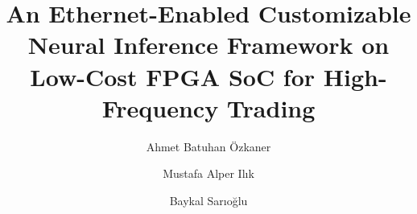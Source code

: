 \documentclass[final,5p,times,twocolumn]{elsarticle}
\begin{document}
\begin{frontmatter}

\title{
An Ethernet-Enabled Customizable Neural Inference Framework
on Low-Cost FPGA SoC for High-Frequency Trading
}

\author[bilgi]{Ahmet Batuhan \"Ozkaner}

\author[bilgi]{Mustafa Alper Il{\i}k}

\author[bilgi]{Baykal Sar{\i}o\u{g}lu}


\address[bilgi]{Department of Electrical and Electronics Engineering,
Istanbul Bilgi University, Istanbul, T\"urkiye}


\end{frontmatter}
\end{document}
